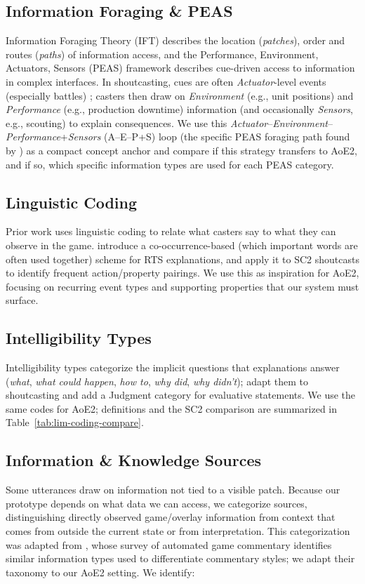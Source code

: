 \subsection{Information Foraging \& PEAS}
Information Foraging Theory (IFT) \cite{pirolli1999} describes the location (\textit{patches}), order and routes (\textit{paths}) of information access, and the Performance, Environment, Actuators, Sensors (PEAS) framework \cite{russell1995} describes cue-driven access to information in complex interfaces. In shoutcasting, cues are often \textit{Actuator}-level events (especially battles) \cite{penney2021}; casters then draw on \textit{Environment} (e.g., unit positions) and \textit{Performance} (e.g., production downtime) information (and occasionally \textit{Sensors}, e.g., scouting) to explain consequences. We use this \textit{Actuator}--\textit{Environment}--\textit{Performance}+\textit{Sensors} (A--E--P+S) loop (the specific PEAS foraging path found by \citet{penney2021}) as a compact concept anchor and compare if this strategy transfers to AoE2, and if so, which specific information types are used for each PEAS category.

\subsection{Linguistic Coding}
Prior work uses linguistic coding to relate what casters say to what they can observe in the game. \citet{metoyer2010} introduce a co-occurrence-based (which important words are often used together) scheme for RTS explanations, and \citet{dodge2018} apply it to SC2 shoutcasts to identify frequent action/property pairings. We use this as inspiration for AoE2, focusing on recurring event types and supporting properties that our system must surface.

\subsection{Intelligibility Types}
Intelligibility types \cite{lim2009} categorize the implicit questions that explanations answer (\textit{what}, \textit{what could happen}, \textit{how to}, \textit{why did}, \textit{why didn't}); \citet{dodge2018} adapt them to shoutcasting and add a Judgment category for evaluative statements. We use the same codes for AoE2; definitions and the SC2 comparison are summarized in Table~\ref{tab:lim-coding-compare}.

\subsection{Information \& Knowledge Sources}
\label{subsec:info-sources}
Some utterances draw on information not tied to a visible patch. Because our prototype depends on what data we can access, we categorize sources, distinguishing directly observed game/overlay information from context that comes from outside the current state or from interpretation. This categorization was adapted from \citet{zheng2025}, whose survey of automated game commentary identifies similar information types used to differentiate commentary styles; we adapt their taxonomy to our AoE2 setting. We identify:

